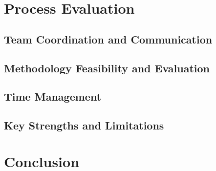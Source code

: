 \documentclass{article}
\begin{document}
\section{Process Evaluation}

    \subsection{Team Coordination and Communication}

    \subsection{Methodology Feasibility and Evaluation}

    \subsection{Time Management}

    \subsection{Key Strengths and Limitations}

\section{Conclusion}
\end{document}
